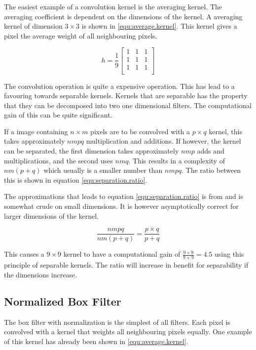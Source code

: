 The easiest example of a convolution kernel is the averaging kernel. The averaging coefficient is dependent on the dimensions of the kernel. 
A averaging kernel of dimension $3 \times 3$ is shown in \eqref{equ:average.kernel}. This kernel gives a pixel the average weight of all 
neighbouring pixels.

\begin{equation}\label{equ:average.kernel}
	h = \frac{1}{9}
	\begin{bmatrix}
		1 & 1 & 1 \\
		1 & 1 & 1 \\
		1 & 1 & 1 \\
	\end{bmatrix}
\end{equation}

The convolution operation is quite a expensive operation. This has lead to a favouring towards separable kernels. Kernels 
that are separable has the property that they can be decomposed into two one dimensional filters. The computational 
gain of this can be quite significant. 

If a image containing $n \times m$ pixels are to be convolved with a $p \times q$ kernel, this takes approximately $nmpq$ 
multiplication and additions. If however, the kernel can be separated, the first dimension takes approximately $nmp$ adds and multiplications,
and the second uses $nmq$. This results in a complexity of $nm(p+q)$ which usually is a smaller number than $nmpq$. The ratio between this is shown in equation \eqref{equ:separation.ratio}.

The approximations that leads to equation \eqref{equ:separation.ratio} is from \citet{eddins06} and is somewhat crude on small dimensions. It is however asymptotically correct 
for larger dimensions of the kernel. 

\begin{equation}\label{equ:separation.ratio}
	\frac{nmpq}{nm(p+q)} =\frac{p \times q}{p + q}
\end{equation}

This causes a $9 \times 9$ kernel to have a computational gain of $\frac{9 \times 9}{9 + 9} = 4.5$ using this principle of separable kernels. The ratio 
will increase in benefit for separability if the dimensions increase.

\subsection{Normalized Box Filter}\label{sec:box.filter}
The box filter with normalization is the simplest of all filters. Each pixel is convolved with a kernel 
that weights all neighbouring pixels equally. One example of this kernel has already been shown in \eqref{equ:average.kernel}.

